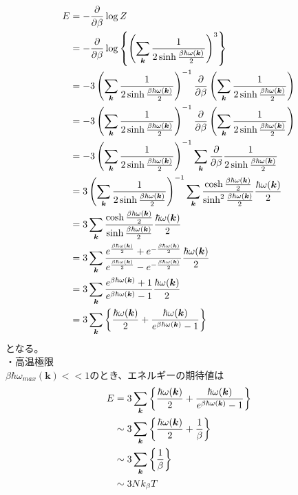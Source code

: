 \documentclass[dvipdfmx, 11pt, a4paper]{jsarticle}
\theoremstyle{definition}
\begin{document}
    \begin{align}
        E &= -\frac{\partial }{\partial \beta} \log Z \notag \\
        &= -\frac{\partial }{\partial \beta} \log \left\{ \left( \sum_{\bm{k}} \frac{1}{2 \sinh \frac{\beta \hbar \omega (\bm{k})}{2}}\right)^{3}  \right\} \notag \\
        &= -3 \left( \sum_{\bm{k}} \frac{1}{2 \sinh \frac{\beta \hbar \omega (\bm{k})}{2}}\right)^{-1} \frac{\partial }{\partial \beta}  \left( \sum_{\bm{k}} \frac{1}{2 \sinh \frac{\beta \hbar \omega (\bm{k})}{2}}\right)  \notag \\
        &= -3 \left( \sum_{\bm{k}} \frac{1}{2 \sinh \frac{\beta \hbar \omega (\bm{k})}{2}}\right)^{-1} \frac{\partial }{\partial \beta}  \left( \sum_{\bm{k}} \frac{1}{2 \sinh \frac{\beta \hbar \omega (\bm{k})}{2}}\right)  \notag \\
        &= -3 \left( \sum_{\bm{k}} \frac{1}{2 \sinh \frac{\beta \hbar \omega (\bm{k})}{2}}\right)^{-1} \sum_{\bm{k}} \frac{\partial }{\partial \beta} \frac{1}{2 \sinh \frac{\beta \hbar \omega (\bm{k})}{2}}  \notag \\
        &= 3 \left( \sum_{\bm{k}} \frac{1}{2 \sinh \frac{\beta \hbar \omega (\bm{k})}{2}}\right)^{-1} \sum_{\bm{k}} \frac{\cosh \frac{\beta \hbar \omega (\bm{k})}{2}}{ \sinh^2 \frac{\beta \hbar \omega (\bm{k})}{2}} \frac{\hbar \omega (\bm{k})}{2}  \notag \\
        &= 3 \sum_{\bm{k}} \frac{\cosh \frac{\beta \hbar \omega (\bm{k})}{2}}{ \sinh \frac{\beta \hbar \omega (\bm{k})}{2}} \frac{\hbar \omega (\bm{k})}{2}  \notag \\
        &= 3 \sum_{\bm{k}} \frac{e^{\frac{\beta \hbar \omega (\bm{k})}{2}} + e^{-\frac{\beta \hbar \omega (\bm{k})}{2}}}{ e^{\frac{\beta \hbar \omega (\bm{k})}{2}} - e^{-\frac{\beta \hbar \omega (\bm{k})}{2}}} \frac{\hbar \omega (\bm{k})}{2}  \notag \\
        &= 3 \sum_{\bm{k}} \frac{e^{\beta \hbar \omega (\bm{k})} + 1}{ e^{\beta \hbar \omega (\bm{k})} - 1} \frac{\hbar \omega (\bm{k})}{2}  \notag \\
        &=3 \sum_{\bm{k}} \left\{ \frac{\hbar \omega (\bm{k})}{2}  +\frac{\hbar \omega (\bm{k})}{ e^{\beta \hbar \omega (\bm{k})} - 1} \right\}
    \end{align}
    となる。\\
    ・高温極限\\
    $\beta \hbar \omega_{max}(\bm{k}) << 1$のとき、エネルギーの期待値は
    \begin{align}
        E &= 3 \sum_{\bm{k}} \left\{ \frac{\hbar \omega (\bm{k})}{2}  +\frac{\hbar \omega (\bm{k})}{ e^{\beta \hbar \omega (\bm{k})} - 1} \right\} \notag \\
        &\sim  3 \sum_{\bm{k}}  \left\{ \frac{\hbar \omega (\bm{k})}{2}  +\frac{1}{\beta} \right\} \notag \\
        &\sim  3 \sum_{\bm{k}}  \left\{ \frac{1}{\beta} \right\} \notag \\
        &\sim 3Nk_\beta T
    \end{align}
\end{document}
